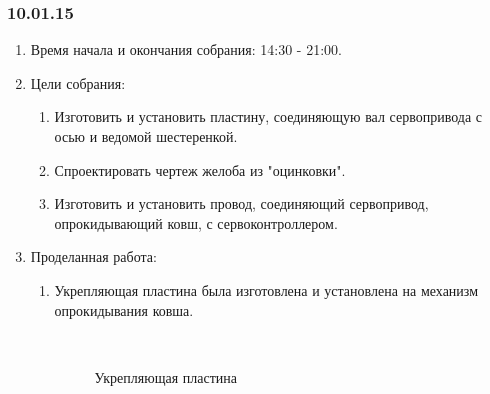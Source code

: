 \subsubsection{10.01.15}
\begin{enumerate}
	
	\item Время начала и окончания собрания: 14:30 - 21:00.
	
	\item Цели собрания: 
	\begin{enumerate}
		
	  \item Изготовить и установить пластину, соединяющую вал сервопривода с осью и ведомой шестеренкой.
		
	  \item Спроектировать чертеж желоба из "оцинковки".
		
      \item Изготовить и установить провод, соединяющий сервопривод, опрокидывающий ковш, с сервоконтроллером.
		
	\end{enumerate}

	\item Проделанная работа:
	\begin{enumerate}
		
		\item Укрепляющая пластина была изготовлена и установлена на механизм опрокидывания ковша.
		\begin{figure}[H]
			\begin{minipage}[h]{0.2\linewidth}
				\center  
			\end{minipage}
			\begin{minipage}[h]{0.6\linewidth}
				\caption{Укрепляющая пластина}
			\end{minipage}
		\end{figure}
		

\end{enumerate}
\end{enumerate}

